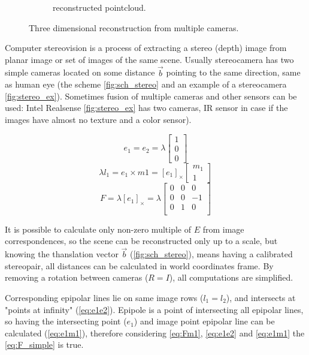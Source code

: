 \begin{figure}[h]
\begin{subfigure}[b]{0.65\textwidth}
      \caption{reconstructed pointcloud.}
      \label{fig:pc_output}
    \end{subfigure}
    \caption{Three dimensional reconstruction from multiple cameras.}
    \label{fig:pc_recons}
\end{figure}

Computer stereovision is a process of extracting a stereo (depth) image from planar image or set of images of the same scene. Usually stereocamera has two simple cameras located on some distance $\vec{b}$ pointing to the same direction, same as human eye (the scheme \autoref{fig:sch_stereo} and an example of a stereocamera \autoref{fig:stereo_ex}). 
Sometimes fusion of multiple cameras and other sensors can be used:
Intel Realsense \autoref{fig:stereo_ex} has two cameras, IR sensor in case if the images have almost no texture and a color sensor). 

\begin{equation}
    \label{eq:e1e2}
    e_1 = e_2 = \lambda \begin{bmatrix} 1 \\ 0 \\ 0 \end{bmatrix}
\end{equation}
\begin{equation}
    \label{eq:e1m1}
    \lambda l_1 = e_1 \times m1 = [e_1]_\times \begin{bmatrix} m_1 \\ 1\end{bmatrix}
\end{equation}
\begin{equation}
    \label{eq:F_simple}
    F = \lambda [e_1]_\times = \lambda \begin{bmatrix}
        0 & 0 & 0 \\
        0 & 0 & -1 \\
        0 & 1 & 0 \\
    \end{bmatrix}
\end{equation}

It is possible to calculate only non-zero multiple of $E$ from image correspondences, so the scene can be reconstructed only up to a scale, but knowing the thanslation vector $\vec{b}$ (\autoref{fig:sch_stereo}), means having a calibrated stereopair, all distances can be calculated in world coordinates frame.
By removing a rotation between cameras ($R = I$), all computations are simplified.

Corresponding epipolar lines lie on same image rows ($l_1 = l_2$), and intersects at "points at infinity" (\autoref{eq:e1e2}). 
Epipole is a point of intersecting all epipolar lines, so having the intersecting point ($e_1$) and image point epipolar line can be calculated (\autoref{eq:e1m1}), therefore considering \autoref{eq:Fm1}, \autoref{eq:e1e2} and \autoref{eq:e1m1} the \autoref{eq:F_simple} is true.


